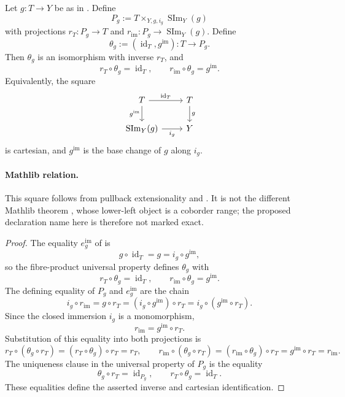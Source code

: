 \begin{lemma}
  \label{lemma:nagata-scheme-image-factor-cartesian}
  \lean{}

  Let $g\colon T\to Y$ be as in
  .  Define
  \[
    P_g:=T\times_{Y,g,i_g}\operatorname{SIm}_Y(g)
  \]
  with projections
  $r_T\colon P_g\to T$ and
  $r_{\mathrm{im}}\colon P_g\to\operatorname{SIm}_Y(g)$.  Define
  \[
    \theta_g:=(\operatorname{id}_T,g^{\mathrm{im}})
      \colon T\longrightarrow P_g.
  \]
  Then $\theta_g$ is an isomorphism with inverse $r_T$, and
  \[
    r_T\circ\theta_g=\operatorname{id}_T,
    \qquad
    r_{\mathrm{im}}\circ\theta_g=g^{\mathrm{im}}.
  \]
  Equivalently, the square
  \[
  \begin{tikzcd}
    T \arrow[r,"\operatorname{id}_T"] \arrow[d,"g^{\mathrm{im}}"'] &
    T \arrow[d,"g"]\\
    \operatorname{SIm}_Y(g) \arrow[r,"i_g"'] & Y
  \end{tikzcd}
  \]
  is cartesian, and $g^{\mathrm{im}}$ is the base change of $g$ along
  $i_g$.

  \paragraph{Mathlib relation.}
  This square follows from pullback extensionality and
  \texttt{}.  It is not the different
  Mathlib theorem
  \texttt{}, whose
  lower-left object is a coborder range; the proposed declaration name here
  is therefore not marked exact.
\end{lemma}

\begin{proof}
  The equality $e_g^{\mathrm{im}}$ of
   is
  \[
    g\circ\operatorname{id}_T
      =g
      =i_g\circ g^{\mathrm{im}},
  \]
  so the fibre-product universal property defines $\theta_g$ with
  \[
    r_T\circ\theta_g=\operatorname{id}_T,
    \qquad
    r_{\mathrm{im}}\circ\theta_g=g^{\mathrm{im}}.
  \]
  The defining equality of $P_g$ and $e_g^{\mathrm{im}}$ are the chain
  \[
    i_g\circ r_{\mathrm{im}}
      =g\circ r_T
      =(i_g\circ g^{\mathrm{im}})\circ r_T
      =i_g\circ(g^{\mathrm{im}}\circ r_T).
  \]
  Since the closed immersion $i_g$ is a monomorphism,
  \[
    r_{\mathrm{im}}=g^{\mathrm{im}}\circ r_T.
  \]
  Substitution of this equality into both projections is
  \[
    r_T\circ(\theta_g\circ r_T)
      =(r_T\circ\theta_g)\circ r_T=r_T,
    \qquad
    r_{\mathrm{im}}\circ(\theta_g\circ r_T)
      =(r_{\mathrm{im}}\circ\theta_g)\circ r_T
      =g^{\mathrm{im}}\circ r_T=r_{\mathrm{im}}.
  \]
  The uniqueness clause in the universal property of $P_g$ is the equality
  \[
    \theta_g\circ r_T=\operatorname{id}_{P_g},
    \qquad
    r_T\circ\theta_g=\operatorname{id}_T.
  \]
  These equalities define the asserted inverse and cartesian identification.
\end{proof}

